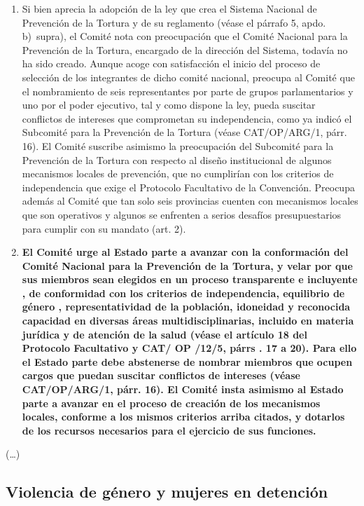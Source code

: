 \documentclass[10pt,twoside,spanish,a5paper,]{book}
\begin{document}
\begin{enumerate}
\def\labelenumi{\arabic{enumi}.}
\setcounter{enumi}{24}
\item
  Si bien aprecia la adopción de la ley que crea el Sistema Nacional de
  Prevención de la Tortura y de su reglamento (véase el párrafo 5, apdo.
  b)~supra), el Comité nota con preocupación que el Comité Nacional para
  la Prevención de la Tortura, encargado de la dirección del Sistema,
  todavía no ha sido creado. Aunque acoge con satisfacción el inicio del
  proceso de selección de los integrantes de dicho comité nacional,
  preocupa al Comité que el nombramiento de seis representantes por
  parte de grupos parlamentarios y uno por el poder ejecutivo, tal y
  como dispone la ley, pueda suscitar conflictos de intereses que
  comprometan su independencia, como ya indicó el Subcomité para la
  Prevención de la Tortura (véase CAT/OP/ARG/1, párr. 16). El Comité
  suscribe asimismo la preocupación del Subcomité para la Prevención de
  la Tortura con respecto al diseño institucional de algunos mecanismos
  locales de prevención, que no cumplirían con los criterios de
  independencia que exige el Protocolo Facultativo de la Convención.
  Preocupa además al Comité que tan solo seis provincias cuenten con
  mecanismos locales que son operativos y algunos se enfrenten a serios
  desafíos presupuestarios para cumplir con su mandato (art. 2).
\item
  \textbf{El Comité urge al Estado parte a avanzar con la conformación
  del Comité Nacional para la Prevención de la Tortura, y velar por que
  sus miembros sean elegidos en un proceso transparente e incluyente ,
  de conformidad con los criterios de independencia, equilibrio de
  género , representatividad de la población, idoneidad y reconocida
  capacidad en diversas áreas multidisciplinarias, incluido en materia
  jurídica y de atención de la salud (véase el artículo 18 del Protocolo
  Facultativo y CAT/ OP /12/5, párrs . 17 a 20). Para ello el Estado
  parte debe abstenerse de nombrar miembros que ocupen cargos que puedan
  suscitar conflictos de intereses (véase CAT/OP/ARG/1, párr. 16). El
  Comité insta asimismo al Estado parte a avanzar en el proceso de
  creación de los mecanismos locales, conforme a los mismos criterios
  arriba citados, y dotarlos de los recursos necesarios para el
  ejercicio de sus funciones.}
\end{enumerate}

(\ldots{})

\hypertarget{violencia-de-guxe9nero-y-mujeres-en-detenciuxf3n}{%
\subsection{Violencia de género y mujeres en
detención}\label{violencia-de-guxe9nero-y-mujeres-en-detenciuxf3n}}
\end{document}
